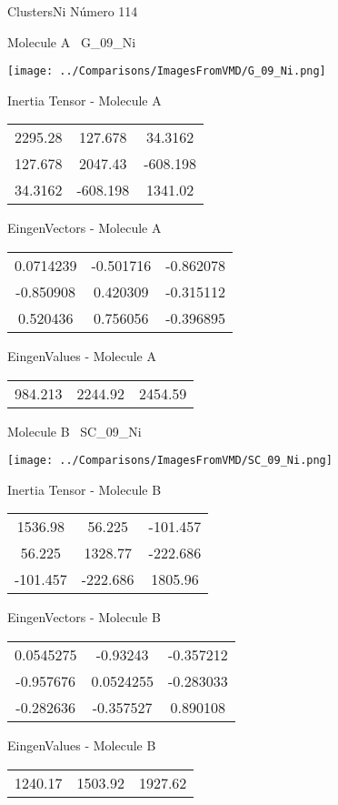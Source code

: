  \newpage

\vtab[-3cm]
\begin{center}
{\large ClustersNi \tab Número 114}
\end{center}
\begin{multicols}{2}
\begin{center}

Molecule A \
G\_09\_Ni

\texttt{[image: ../Comparisons/ImagesFromVMD/G\_09\_Ni.png]}

Inertia Tensor - Molecule A \\
\begin{tabular}{|c c c|}
2295.28	 & 	127.678	 & 	34.3162	 \\
127.678	 & 	2047.43	 & 	-608.198	 \\
34.3162	 & 	-608.198	 & 	1341.02
\end{tabular}

\vtab
 EingenVectors - Molecule A     \\
\begin{tabular}{|c c c|}
0.0714239	 & 	-0.501716	 & 	-0.862078	 \\
-0.850908	 & 	0.420309	 & 	-0.315112	 \\
0.520436	 & 	0.756056	 & 	-0.396895
\end{tabular}

\vtab
 EingenValues - Molecule A     \\
\begin{tabular}{|c c c|}
984.213	 & 	2244.92	 & 	2454.59	 \\
\end{tabular}
\columnbreak

Molecule B \
SC\_09\_Ni

\texttt{[image: ../Comparisons/ImagesFromVMD/SC\_09\_Ni.png]}

Inertia Tensor - Molecule B \\
\begin{tabular}{|c c c|}
1536.98	 & 	56.225	 & 	-101.457	 \\
56.225	 & 	1328.77	 & 	-222.686	 \\
-101.457	 & 	-222.686	 & 	1805.96
\end{tabular}

\vtab
 EingenVectors - Molecule B     \\
\begin{tabular}{|c c c|}
0.0545275	 & 	-0.93243	 & 	-0.357212	 \\
-0.957676	 & 	0.0524255	 & 	-0.283033	 \\
-0.282636	 & 	-0.357527	 & 	0.890108
\end{tabular}

\vtab
 EingenValues - Molecule B     \\
\begin{tabular}{|c c c|}
1240.17	 & 	1503.92	 & 	1927.62	 \\
\end{tabular}

\end{center}
\end{multicols}

